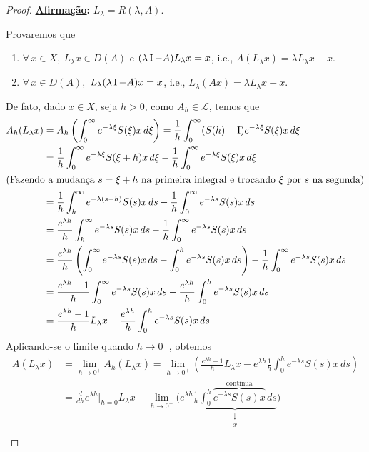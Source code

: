 \begin{proof}
\noindent \textbf{\underline{Afirmação}:} $L_\lambda= R(\lambda,A)$.

Provaremos que
\begin{enumerate}
\item $\forall\, x\in X,\ L_\lambda x\in D(A)$ e $(\lambda \operatorname{I}-A)L_\lambda x=x$, i.e., $A\left(L_\lambda x\right)=\lambda L_\lambda x -x$.
\item $\forall\, x\in D(A),$ $L_\lambda(\lambda \operatorname{I}-A)x=x$, i.e., $L_\lambda(Ax)=\lambda L_\lambda x-x$.
\end{enumerate}

De fato, dado $x\in X$, seja $h>0$, como $A_h\in \mathcal{L}$, temos que
\begin{align*}
A_h(L_\lambda x)& =A_h\left(\int_0^\infty e^{-\lambda \xi}S(\xi)x\, d\xi\right)
=\frac{1}{h}\int_0^\infty (S(h)-\operatorname{I}) e^{-\lambda \xi}S(\xi)x\, d\xi\\
&= \frac{1}{h}\int_0^\infty e^{-\lambda \xi}S(\xi+h)x\, d\xi- 
\frac{1}{h}\int_0^\infty e^{-\lambda \xi}S(\xi)x\, d\xi\\
\shortintertext{(Fazendo a mudança $s=\xi+h$ na primeira integral e trocando $\xi$ por $s$ na segunda)}
& = \frac{1}{h}\int_h^\infty e^{-\lambda (s-h)}S(s)x\, ds- 
\frac{1}{h}\int_0^\infty e^{-\lambda s}S(s)x\, ds\\
& = \frac{e^{\lambda h}}{h}\int_h^\infty e^{-\lambda s}S(s)x\, ds- 
\frac{1}{h}\int_0^\infty e^{-\lambda s}S(s)x\, ds\\
& = \frac{e^{\lambda h}}{h}\left(\int_0^\infty e^{-\lambda s}S(s)x\, ds
-\int_0^h e^{-\lambda s}S(s)x\, ds\right)- 
\frac{1}{h}\int_0^\infty e^{-\lambda s}S(s)x\, ds\\
& = \frac{e^{\lambda h}-1}{h}\int_0^\infty e^{-\lambda s}S(s)x\, ds
-\frac{e^{\lambda h}}{h}\int_0^h e^{-\lambda s}S(s)x\, ds\\
&= \frac{e^{\lambda h}-1}{h}L_\lambda x
-\frac{e^{\lambda h}}{h}\int_0^h e^{-\lambda s}S(s)x\, ds
\end{align*}
Aplicando-se o limite quando $h\to0^+$, obtemos
\begin{align*}
A\left(L_\lambda x\right)&=\lim_{h\to0^+}A_h(L_\lambda x) =\lim_{h\to0^+}\left(\frac{e^{\lambda h}-1}{h}
L_\lambda x-e^{\lambda h}\frac{1}{h}\int_0^h
e^{-\lambda s}S(s)x\, ds\right)\\
& =\frac{d}{dh}e^{\lambda h}\Big\vert_{h=0}
L_\lambda x-\lim_{h\to0^+}
\bigg(e^{\lambda h}\underbrace{\frac{1}{h}\int_0^h
\overbrace{e^{-\lambda s}S(s)x}^{\text{contínua}}\,
 ds}_{\substack{\downarrow \\ x}}\bigg)\\[-1em]

\end{align*}
\end{proof}
